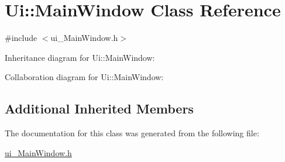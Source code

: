 \hypertarget{classUi_1_1MainWindow}{}\section{Ui\+:\+:Main\+Window Class Reference}
\label{classUi_1_1MainWindow}


{\ttfamily \#include $<$ui\+\_\+\+Main\+Window.\+h$>$}



Inheritance diagram for Ui\+:\+:Main\+Window\+:


Collaboration diagram for Ui\+:\+:Main\+Window\+:
\subsection*{Additional Inherited Members}


The documentation for this class was generated from the following file\+:\begin{DoxyCompactItemize}
\item 
\hyperlink{ui__MainWindow_8h}{ui\+\_\+\+Main\+Window.\+h}\end{DoxyCompactItemize}
